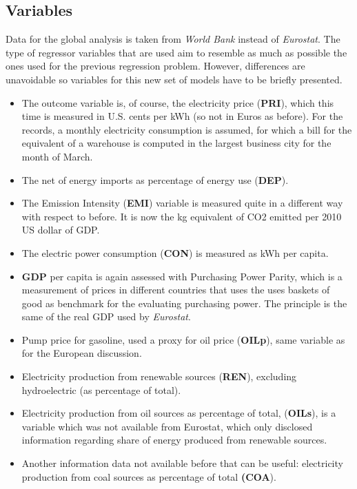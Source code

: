\documentclass{book}
\begin{document}
\subsection{Variables}

Data for the global analysis is taken from \textit{World Bank} instead of \textit{Eurostat}. The type of regressor variables that are used aim to resemble as much as possible the ones used for the previous regression problem. However, differences are unavoidable so variables for this new set of models have to be briefly presented.

\begin{itemize}
\item The outcome variable is, of course, the electricity price (\textbf{PRI}), which this time is measured in U.S. cents per kWh (so not in Euros as before). For the records, a monthly electricity consumption is assumed, for which a bill for the equivalent of a warehouse is computed in the largest business city for the month of March. 
\item The net of energy imports as percentage of energy use (\textbf{DEP}).
\item The Emission Intensity (\textbf{EMI}) variable is measured quite in a different way with respect to before. It is now the kg equivalent of CO2 emitted per 2010 US dollar of GDP.
\item The electric power consumption (\textbf{CON}) is measured as kWh per capita.
\item \textbf{GDP} per capita is again assessed with Purchasing Power Parity, which is a measurement of prices in different countries that uses the uses baskets of good as benchmark for the evaluating purchasing power. The principle is the same of the real GDP used by \textit{Eurostat}.
\item Pump price for gasoline, used a proxy for oil price (\textbf{OILp}), same variable as for the European discussion.
\item Electricity production from renewable sources (\textbf{REN}), excluding hydroelectric (as percentage of total).
\item Electricity production from oil sources as percentage of total, (\textbf{OILs}), is a variable which was not available from Eurostat, which only disclosed information regarding share of energy produced from renewable sources.
\item Another information data not available before that can be useful: electricity production from coal sources as percentage of total \textbf{(COA}).
\end{itemize}
\end{document}
